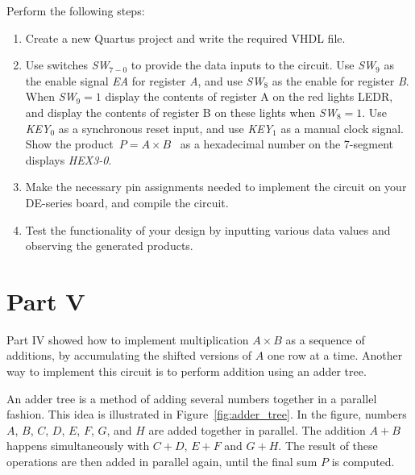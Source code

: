 \documentclass[epsfig,10pt,fullpage]{article}
\begin{document}
Perform the following steps:
\begin{enumerate}
\item Create a new Quartus project and write the required VHDL file.
\item Use switches {\it SW}$_{7-0}$ to provide the data inputs to the circuit. Use
{\it SW}$_9$ as the enable signal {\it EA} for register {\it A}, and use {\it SW}$_8$
as the enable for register {\it B}.  When {\it SW}$_9 = 1$ display the contents of
register A on the red lights LEDR, and display the contents of register B on these lights
when {\it SW}$_8 = 1$. Use {\it KEY}$_0$ as a synchronous reset input, and use 
{\it KEY}$_1$ as a manual clock signal.  Show the product~$P = A \times B$~ as a
hexadecimal number on the 7-segment displays {\it HEX3-0}.
\item Make the necessary pin assignments needed to implement the circuit on your
DE-series board, and compile the circuit.
\item Test the functionality of your design by inputting various data values and observing
the generated products.
\end{enumerate}

\section*{Part V}
Part IV showed how to implement multiplication $A \times B$ as a sequence of additions, 
by accumulating the shifted versions of $A$ one row at a time. Another way to implement 
this circuit is to perform addition using an adder tree.

An adder tree is a method of adding several numbers together in a parallel fashion. This 
idea is illustrated in Figure~\ref{fig:adder_tree}. In the figure, numbers 
$A$, $B$, $C$, $D$, $E$, $F$, $G$, and $H$ are added together in parallel.
The addition $A + B$ happens simultaneously with $C + D$, $E + F$ and $G + H$. The 
result of these operations are then added in parallel
again, until the final sum $P$ is computed.
\end{document}
